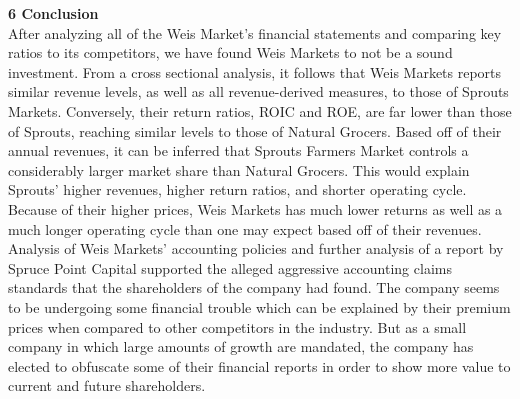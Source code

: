 \documentclass[12pt]{article}
\begin{document}
\begin{doublespacing}
\textbf{6 Conclusion}
\\
After analyzing all of the Weis Market's financial statements and comparing key ratios to its competitors, we have found Weis Markets to not be a sound investment.
From a cross sectional analysis, it follows that Weis Markets reports similar revenue levels, as well as all revenue-derived measures, to those of Sprouts Markets. Conversely, their return ratios, ROIC and ROE, are far lower than those of Sprouts, reaching similar levels to those of Natural Grocers. Based off of their annual revenues, it can be inferred that Sprouts Farmers Market controls a considerably larger market share than Natural Grocers. This would explain Sprouts' higher revenues, higher return ratios, and shorter operating cycle. Because of their higher prices, Weis Markets has much lower returns as well as a much longer operating cycle than one may expect based off of their revenues. Analysis of Weis Markets' accounting policies and further analysis of a report by Spruce Point Capital supported the alleged aggressive accounting claims standards that the shareholders of the company had found. The company seems to be undergoing some financial trouble which can be explained by their premium prices when compared to other competitors in the industry. But as a small company in which large amounts of growth are mandated, the company has elected to obfuscate some of their financial reports in order to show more value to current and future shareholders. 




\end{doublespacing}
\end{document}

